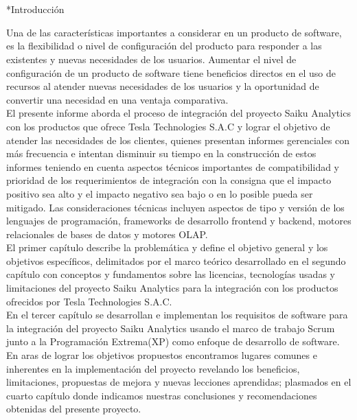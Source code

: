 \clearpage
{}
{}

\section{}*{Introducción}
\begin{spacing}{1.5}
	Una de las características importantes a considerar en un producto de software, es la flexibilidad o nivel de configuración del producto para responder a las existentes y nuevas necesidades de los usuarios. Aumentar el nivel de configuración de un producto de software tiene beneficios directos en el uso de recursos al atender nuevas necesidades de los usuarios y la oportunidad de convertir una necesidad en una ventaja comparativa.\\
	El presente informe aborda el proceso de integración del proyecto Saiku Analytics con los productos que ofrece Tesla Technologies S.A.C y lograr el objetivo de atender las necesidades de los clientes, quienes presentan informes gerenciales con más frecuencia e intentan disminuir su tiempo en la construcción de estos informes teniendo en cuenta aspectos técnicos importantes de compatibilidad y prioridad de los requerimientos de integración con la consigna que el impacto positivo sea alto y el impacto negativo sea bajo o en lo posible pueda ser mitigado. Las consideraciones t\'{e}cnicas incluyen aspectos de tipo y versi\'{o}n de los lenguajes de programaci\'{o}n, frameworks de desarrollo frontend y backend, motores relacionales de bases de datos y motores OLAP.\\
	El primer capítulo describe la problemática y define el objetivo general y los objetivos específicos, delimitados por el marco teórico desarrollado en el segundo capítulo con conceptos y fundamentos sobre las licencias, tecnologías usadas y limitaciones del proyecto Saiku Analytics para la integración con los productos ofrecidos por Tesla Technologies S.A.C.\\
	En el tercer cap\'{i}tulo se desarrollan e implementan los requisitos de software para la integraci\'{o}n del proyecto Saiku Analytics usando el marco de trabajo Scrum junto a la Programaci\'{o}n Extrema(XP) como enfoque de desarrollo de software.\\
	En aras de lograr los objetivos propuestos encontramos lugares comunes e inherentes en la implementaci\'{o}n del proyecto revelando los beneficios, limitaciones, propuestas de mejora y nuevas lecciones aprendidas; plasmados en el cuarto capítulo donde indicamos nuestras conclusiones y recomendaciones obtenidas del presente proyecto.\\
\end{spacing}
